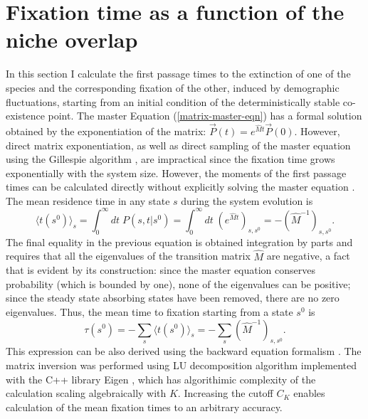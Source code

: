 \section{Fixation time as a function of the niche overlap}
In this section I calculate the first passage times to the extinction of one of the species and the corresponding fixation of the other, induced by demographic fluctuations, starting from an initial condition of the deterministically stable co-existence point. 
The master Equation (\ref{matrix-master-eqn}) has a formal solution obtained by the exponentiation of the matrix: $\vec{P}(t) = e^{\hat{M} t}\vec{P}(0)$. 
However, direct matrix exponentiation, as well as direct sampling of the master equation using the Gillespie algorithm \cite{Gillespie1977,Cao2006}, are impractical since the fixation time grows exponentially with the system size. %
However, the moments of the first passage times can be calculated directly without explicitly solving the master equation \cite{Grinstead2003}. 
The mean residence time in any state $s$ during the system evolution is
\begin{equation}
\langle t(s^0)\rangle_s=\int_0^\infty dt\; P(s,t|s^0)=\int_0^\infty dt \; (e^{\hat{M}t})_{s,s^0}=-(\hat{M}^{-1})_{s,s^0}. \label{residence-time}
\end{equation}
The final equality in the previous equation is obtained integration by parts and requires that all the eigenvalues of the transition matrix $\hat{M}$ are negative, a fact that is evident by its construction: since the master equation conserves probability (which is bounded by one), none of the eigenvalues can be positive; since the steady state absorbing states have been removed, there are no zero eigenvalues. 
Thus, the mean time to fixation starting from a state $s^0$ is \cite{Iyer-Biswas2015}
\begin{equation} \label{explicit-tau}
\tau(s^0) =-\sum_s\langle t(s^0)\rangle_s=-\sum_s \left(\hat{M}^{-1}\right)_{s,s^0}.
\end{equation}
This expression can be also derived using the backward equation formalism \cite{Iyer-Biswas2015}.
The matrix inversion was performed using LU decomposition algorithm implemented with the C++ library Eigen \cite{eigenweb}, which has algorithimic complexity of the calculation scaling algebraically with $K$.
Increasing the cutoff $C_K$ enables calculation of the mean fixation times to an arbitrary accuracy.

